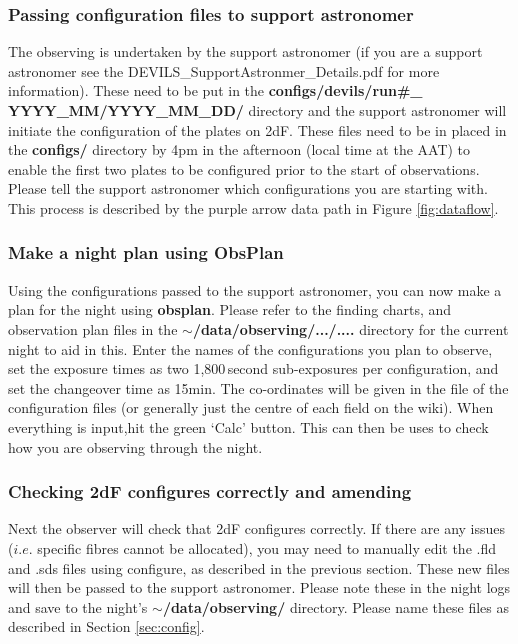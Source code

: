 \documentclass[12pt]{article}
\begin{document}
\subsubsection{Passing configuration files to support astronomer}

The observing is undertaken by the support astronomer (if you are a support astronomer see the DEVILS\_SupportAstronmer\_Details.pdf for more information). These need to be put in the \textbf{configs/devils/run\#\_
YYYY\_MM/YYYY\_MM\_DD/} directory and the support astronomer will initiate the configuration of the plates on 2dF. These files need to be in placed in the \textbf{configs/} directory by 4pm in the afternoon (local time at the AAT) to enable the first two plates to be configured prior to the start of observations. Please tell the support astronomer which configurations you are starting with. This process is described by the purple arrow data path in Figure \ref{fig:dataflow}. 

\subsubsection{Make a night plan using ObsPlan}

Using the configurations passed to the support astronomer, you can now make a plan for the night using \textbf{obsplan}. Please refer to the finding charts, and observation plan files in the \textbf{$\sim$/data/observing/.../....} directory for the current night to aid in this. Enter the names of the configurations you plan to observe, set the exposure times as two 1,800\,second sub-exposures per configuration, and set the changeover time as 15min. The co-ordinates will be given in the file of the configuration files (or generally just the centre of each field on the wiki). When everything is input,hit the green `Calc' button. This can then be uses to check how you are observing through the night.      

\subsubsection{Checking 2dF configures correctly and amending}

Next the observer will check that 2dF configures correctly. If there are any issues ($i.e.$ specific fibres cannot be allocated), you may need to manually edit the .fld and .sds files using configure, as described in the previous section. These new files will then be passed to the support astronomer. Please note these in the night logs and save to the night's \textbf{$\sim$/data/observing/} directory. Please name these files as described in Section \ref{sec:config}.
\end{document}

